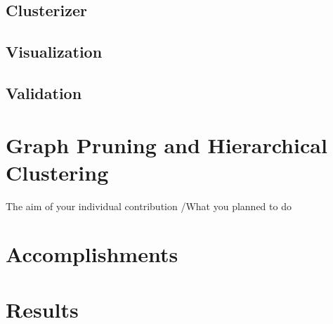 \documentclass[11pt]{article} %
\begin{document}
\subsection{Clusterizer}
\subsection{Visualization}
\subsection{Validation}

\section{Graph Pruning and Hierarchical Clustering}
The aim of your individual contribution /What you planned to do

\section{Accomplishments}


\section{Results}
\end{document}
